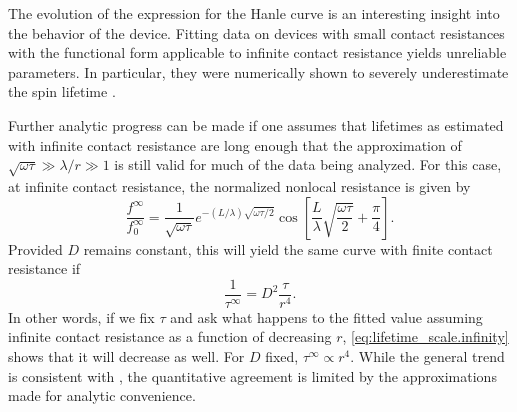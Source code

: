 The evolution of the expression for the Hanle curve
is an interesting insight into the behavior of the device.
Fitting data on devices with small contact resistances
with the functional form applicable to infinite contact resistance
yields unreliable parameters.
In particular, they were numerically shown to severely underestimate the spin lifetime
\cite{PhysRevB.86.235408}.

Further analytic progress can be made if one assumes that
lifetimes as estimated with infinite contact resistance are long
enough that the approximation of $\sqrt{ω τ} ≫ λ / r ≫ 1$
is still valid for much of the data being analyzed.
For this case, at infinite contact resistance,
the normalized nonlocal resistance is given by
\begin{equation}
  \frac{f^∞}{f^∞_0} = \frac{1}{ \sqrt{ω τ}}
                      e^{- \left( L / λ \right) \sqrt{ω τ / 2}}
                      \cos{\left[ \frac{L}{λ} \sqrt{\frac{ω τ}{2}} + \frac{π}{4} \right]} .
\end{equation}
Provided $D$ remains constant,
this will yield the same curve with finite contact resistance if
\begin{equation}
  \label{eq:lifetime_scale.infinity}
  \frac{1}{τ^∞} = D^2 \frac{τ}{r^4} .
\end{equation}
In other words, if we fix $τ$ and ask what happens to the fitted value
assuming infinite contact resistance as a function of decreasing $r$,
\cref{eq:lifetime_scale.infinity} shows that it will decrease as well.
For $D$ fixed, $τ^∞ ∝ r^4$.
While the general trend is consistent with
\cite{PhysRevB.86.235408},
the quantitative agreement is limited by
the approximations made for analytic convenience.
